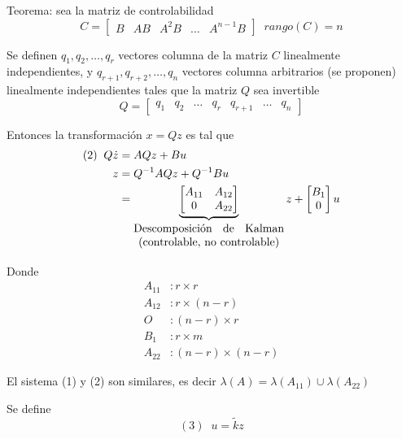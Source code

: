 Teorema: sea la matriz de controlabilidad
\[
    C = \begin{bmatrix}
            B & AB & A^{2}B & \ldots & A^{n-1}B
        \end{bmatrix} \;\; rango(C) = n
\]

Se definen \( q_{1}, q_{2}, \ldots, q_{r} \) vectores columna de la matriz \( C \) linealmente independientes, y \( q_{r+1}, q_{r+2}, \ldots, q_{n} \) vectores columna arbitrarios (se proponen) linealmente independientes tales que la matriz \( Q \) sea invertible
\[
    Q = \begin{bmatrix}
            q_{1} & q_{2} & \ldots & q_{r} & q_{r+1} & \ldots & q_{n} 
        \end{bmatrix}
\]

Entonces la transformación \( x = Qz \) es tal que
\[  
    \begin{split}
        (2)\;\; Q\dot{z} & = AQz + Bu \\
        z & = Q^{-1}AQz + Q^{-1}Bu \\
        & = \underbrace
            {
            \begin{bmatrix}
                A_{11} & A_{12} \\
                0 & A_{22}
            \end{bmatrix}
            }_{
            \begin{matrix}
                \text{Descomposición \; de \; Kalman} \\
                 \text{(controlable, no controlable)}
            \end{matrix} }
            z +
            \begin{bmatrix}
                B_{1} \\ 0
            \end{bmatrix} u
    \end{split}
\]

Donde
\[
    \begin{split}
        A_{11} & : r \times r \\
        A_{12} & : r \times (n-r)\\
        O & : (n-r) \times r\\
        B_{1} & : r \times m \\
        A_{22} & : (n-r)\times (n-r)
    \end{split}
\]

El sistema (1) y (2) son similares, es decir \( \lambda(A) = \lambda(A_{11}) \cup \lambda(A_{22}) \)

Se define 
\[
    (3) \;\; u = \tilde{k}z
\]

